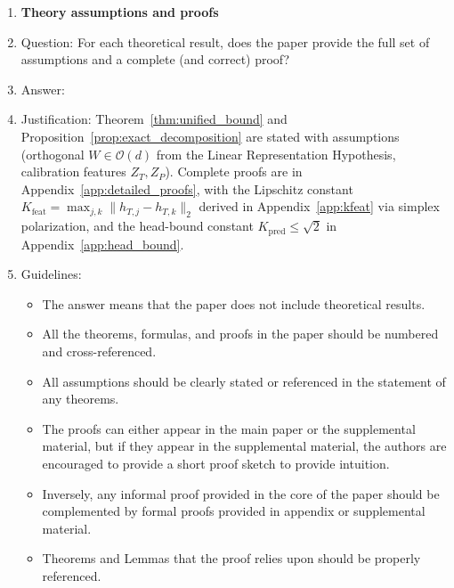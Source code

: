\begin{enumerate}
\begin{itemize}
        \item If applicable, the authors should discuss possible limitations of their approach to address problems of privacy and fairness.
        \item While the authors might fear that complete honesty about limitations might be used by reviewers as grounds for rejection, a worse outcome might be that reviewers discover limitations that aren't acknowledged in the paper. The authors should use their best judgment and recognize that individual actions in favor of transparency play an important role in developing norms that preserve the integrity of the community. Reviewers will be specifically instructed to not penalize honesty concerning limitations.
    \end{itemize}

\item {\bf Theory assumptions and proofs}
    \item[] Question: For each theoretical result, does the paper provide the full set of assumptions and a complete (and correct) proof?
    \item[] Answer: \answerYes{}
    \item[] Justification: Theorem~\ref{thm:unified_bound} and Proposition~\ref{prop:exact_decomposition} are stated with assumptions (orthogonal $W \in \mathcal{O}(d)$ from the Linear Representation Hypothesis, calibration features $Z_T, Z_P$). Complete proofs are in Appendix~\ref{app:detailed_proofs}, with the Lipschitz constant $K_{\mathrm{feat}} = \max_{j,k}\|h_{T,j}-h_{T,k}\|_2$ derived in Appendix~\ref{app:kfeat} via simplex polarization, and the head-bound constant $K_{\mathrm{pred}} \le \sqrt{2}$ in Appendix~\ref{app:head_bound}.
    \item[] Guidelines:
    \begin{itemize}
        \item The answer \answerNA{} means that the paper does not include theoretical results.
        \item All the theorems, formulas, and proofs in the paper should be numbered and cross-referenced.
        \item All assumptions should be clearly stated or referenced in the statement of any theorems.
        \item The proofs can either appear in the main paper or the supplemental material, but if they appear in the supplemental material, the authors are encouraged to provide a short proof sketch to provide intuition.
        \item Inversely, any informal proof provided in the core of the paper should be complemented by formal proofs provided in appendix or supplemental material.
        \item Theorems and Lemmas that the proof relies upon should be properly referenced.
    \end{itemize}


\end{enumerate}
